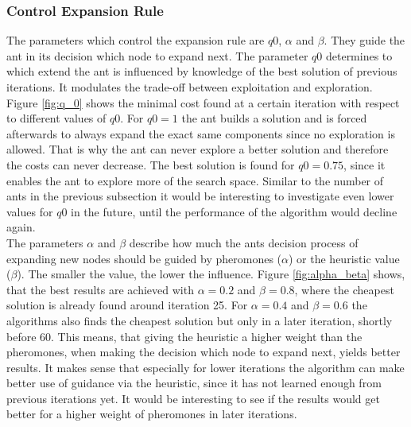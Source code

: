 \subsubsection{Control Expansion Rule}\label{expansion_rule}

The parameters which control the expansion rule are $q0$, $\alpha$ and $\beta$. They guide the ant in its decision which node to expand next. The parameter $q0$ determines to which extend the ant is influenced by knowledge of the best solution of previous iterations. It modulates the trade-off between exploitation and exploration. Figure \ref{fig:q_0} shows the minimal cost found at a certain iteration with respect to different values of $q0$. For $q0 = 1$ the ant builds a solution and is forced afterwards to always expand the exact same components since no exploration is allowed. That is why the ant can never explore a better solution and therefore the costs can never decrease. The best solution is found for $q0 = 0.75$, since it enables the ant to explore more of the search space. Similar to the number of ants in the previous subsection it would be interesting to investigate even lower values for $q0$ in the future, until the performance of the algorithm would decline again. \\

The parameters $\alpha$ and $\beta$ describe how much the ants decision process of expanding new nodes should be guided by pheromones ($\alpha$) or the heuristic value ($\beta$). The smaller the value, the lower the influence. Figure \ref{fig:alpha_beta} shows, that the best results are achieved with $\alpha = 0.2$ and $\beta = 0.8$, where the cheapest solution is already found around iteration 25. For $\alpha = 0.4$ and $\beta = 0.6$ the algorithms also finds the cheapest solution but only in a later iteration, shortly before 60. This means, that giving the heuristic a higher weight than the pheromones, when making the decision which node to expand next, yields better results. It makes sense that especially for lower iterations the algorithm can make better use of guidance via the heuristic, since it has not learned enough from previous iterations yet. It would be interesting to see if the results would get better for a higher weight of pheromones in later iterations.

